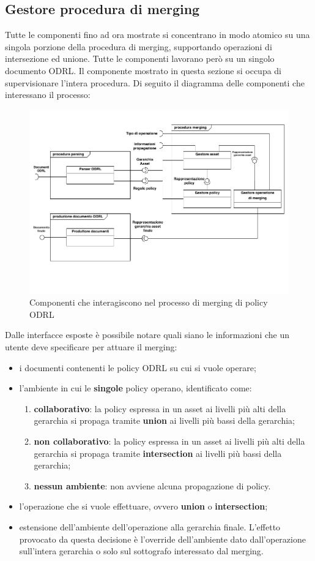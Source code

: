 \documentclass[12pt,a4paper,twoside]{book}
\begin{document}
\subsection{Gestore procedura di merging}
Tutte le componenti fino ad ora mostrate si concentrano in modo atomico su una singola porzione della procedura di merging, supportando operazioni di intersezione ed unione. Tutte le componenti lavorano però su un singolo documento ODRL. Il componente mostrato in questa sezione si occupa di supervisionare l'intera procedura. Di seguito il diagramma delle componenti che interessano il processo:
\begin{figure}[H]
	\centering
	\includegraphics[scale=.70]{../immagini/processoMergin.pdf}
	\caption{Componenti che interagiscono nel processo di merging di policy ODRL}
	\label{procMergin}
\end{figure}
Dalle interfacce esposte è possibile notare quali siano le informazioni che un utente deve specificare per attuare il merging:
\begin{itemize}
	\item i documenti contenenti le policy ODRL su cui si vuole operare;
	\item l'ambiente in cui le \textbf{singole} policy operano, identificato come:
	\begin{enumerate}
		\item \textbf{collaborativo}: la policy espressa in un asset ai livelli più alti della gerarchia si propaga tramite \textbf{union} ai livelli più bassi della gerarchia;
		\item \textbf{non collaborativo}: la policy espressa in un asset ai livelli più alti della gerarchia si propaga tramite \textbf{intersection} ai livelli più bassi della gerarchia;
		\item \textbf{nessun ambiente}: non avviene alcuna propagazione di policy.
	\end{enumerate} 
	\item l'operazione che si vuole effettuare, ovvero \textbf{union} o \textbf{intersection};
	\item estensione dell'ambiente dell'operazione alla gerarchia finale. L'effetto provocato da questa decisione è l'override dell'ambiente dato dall'operazione sull'intera gerarchia o solo sul sottografo interessato dal merging.
\end{itemize}
\end{document}
